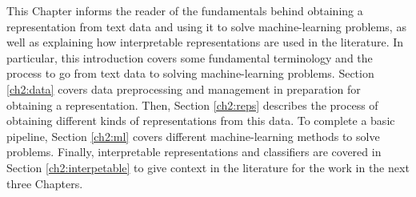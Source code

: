 This Chapter informs the reader of the fundamentals behind obtaining a representation from text data and using it to solve machine-learning problems, as well as explaining how interpretable representations are used in the literature. In particular, this introduction covers some fundamental terminology and the process to go from text data to solving machine-learning problems. Section \ref{ch2:data} covers data preprocessing and management in preparation for obtaining a representation. Then, Section \ref{ch2:reps} describes the process of obtaining different kinds of representations from this data. To complete a basic pipeline, Section \ref{ch2:ml} covers different machine-learning methods to solve problems. Finally, interpretable representations and classifiers are covered in Section \ref{ch2:interpetable} to give context in the literature for the work in the next three Chapters. 






